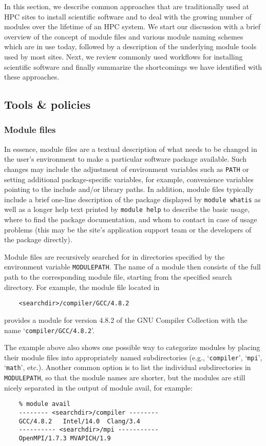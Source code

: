 In this section, we describe common approaches that are traditionally used at
HPC sites to install scientific software and to deal with the growing number
of modules over the lifetime of an HPC system. We start our discussion with a
brief overview of the concept of module files and various module naming
schemes which are in use today, followed by a description of the underlying
module tools used by most sites. Next, we review commonly used workflows for
installing scientific software and finally summarize the shortcomings we have
identified with these approaches.

\subsection{Tools \& policies}

\subsubsection{Module files}
\label{sec:Module_files}

In essence, module files are a textual description of what needs to be
changed in the user's environment to make a particular software package
available. Such changes may include the adjustment of environment variables
such as \texttt{PATH} or setting additional package-specific variables, for
example, convenience variables pointing to the include and/or library paths.
In addition, module files typically include a brief one-line description of
the package displayed by \texttt{module whatis} as well as a longer help text
printed by \texttt{module help} to describe the basic usage, where to find
the package documentation, and whom to contact in case of usage problems
(this may be the site's application support team or the developers of the
package directly).

Module files are recursively searched for in directories specified by the
environment variable \texttt{MODULEPATH}. The name of a module then consists
of the full path to the corresponding module file, starting from the
specified search directory. For example, the module file located in
\begin{verbatim}
    <searchdir>/compiler/GCC/4.8.2
\end{verbatim}
provides a module for version 4.8.2 of the GNU Compiler Collection with the
name `\texttt{compiler/GCC/4.8.2}'.

The example above also shows one possible way to categorize modules by
placing their module files into appropriately named subdirectories (e.g.,
`\texttt{compiler}', `\texttt{mpi}', `\texttt{math}', etc.). Another common
option is to list the individual subdirectories in \texttt{MODULEPATH}, so
that the module names are shorter, but the modules are still nicely separated
in the output of module avail, for example:
\begin{verbatim}
    % module avail
    -------- <searchdir>/compiler --------
    GCC/4.8.2   Intel/14.0  Clang/3.4
    ---------- <searchdir>/mpi -----------
    OpenMPI/1.7.3 MVAPICH/1.9
\end{verbatim}

